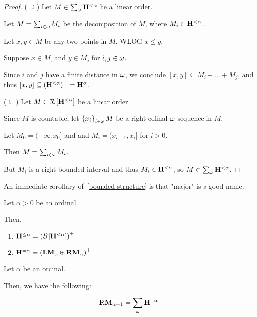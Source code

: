 \begin{proof}
  ($\supseteq$) Let $M \in \sum_{\omega}{\mathbf{H}_{}^{< \alpha}}$ be a linear order.

  Let $M = \sum_{i \in \omega} M_i$ be the decomposition of $M$,
  where $M_i \in \mathbf{H}_{}^{< \alpha}$.

  Let $x, y \in M$ be any two points in $M$. WLOG $x \le y$.

  Suppose $x \in M_i$ and $y \in M_j$ for $i, j \in \omega$.

  Since $i$ and $j$ have a finite distance in $\omega$,
  we conclude $[x, y] \subseteq M_i + \ldots + M_j$,
  and thus $[x, y] \subseteq \left( {\mathbf{H}_{}^{< \alpha}} \right)^+ = \mathbf{H}_{}^{{\alpha}}$.

  ($\subseteq$) Let $M \in \mathcal{R} \left[ {{\mathbf{H}_{}^{< \alpha}}} \right]$ be a linear order.

  Since $M$ is countable, let $\left\{ {x_i} \right\}_{i \in \omega} M$ be a right cofinal
  $\omega$-sequence in $M$.

  Let $M_0 = (-\infty, x_0]$ and and $M_i = (x_{i-1}, x_{i}]$ for $i > 0$.

  Then $M = \sum_{i \in \omega} M_i$.

  But $M_i$ is a right-bounded interval and thus $M_i \in \mathbf{H}_{}^{< \alpha}$, so $M \in \sum_{\omega}{\mathbf{H}_{}^{< \alpha}}$.
\end{proof}

An immediate corollary of~\cref{bounded-structure} is that "major" is a good name.
\begin{corollary}\label{le-alpha-corollary}
  Let $\alpha > 0$ be an ordinal.

  Then,
  \begin{enumerate}
    \item $\mathbf{H}_{}^{\le \alpha} = \left( {\mathcal{B} \left[ {{\mathbf{H}_{}^{< \alpha}}} \right]} \right)^+$
    \item $\mathbf{H}_{}^{= \alpha} = \left( { \mathbf{LM}_{\alpha} \uplus \mathbf{RM}_{\alpha} } \right)^+$
  \end{enumerate}
\end{corollary}

\begin{lemma}\label{right-major-successor-decomposition}
  Let $\alpha$ be an ordinal.

  Then, we have the following:

  \[
    \mathbf{RM}_{\alpha + 1} = \sum_{\omega}{\mathbf{H}_{}^{= \alpha}}
  \]
\end{lemma}

